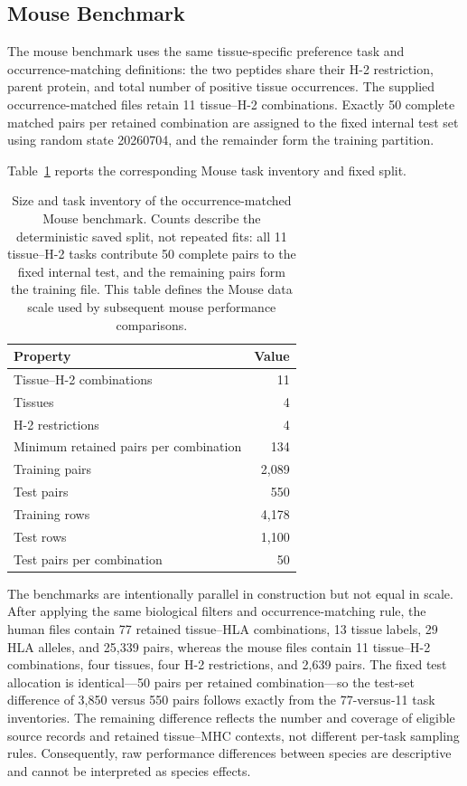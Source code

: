 \documentclass[webpdf,modern,large,nocrop,noinfo]{oup-authoring-template}
\newcommand{\plainHtwo}{H-2}
\begin{document}
\subsection{Mouse Benchmark}
\label{sec:mouse-benchmark}

The mouse benchmark uses the same tissue-specific preference task and occurrence-matching definitions: the two peptides share their H-2 restriction, parent protein, and total number of positive tissue occurrences. The supplied occurrence-matched files retain 11 tissue--H-2 combinations. Exactly 50 complete matched pairs per retained combination are assigned to the fixed internal test set using random state 20260704, and the remainder form the training partition.

Table~\ref{tab:mouse-benchmark-stats} reports the corresponding Mouse task inventory and fixed split.

\begin{table}[tbp]
\centering
\caption{Size and task inventory of the occurrence-matched Mouse benchmark. Counts describe the deterministic saved split, not repeated fits: all 11 tissue--H-2 tasks contribute 50 complete pairs to the fixed internal test, and the remaining pairs form the training file. This table defines the Mouse data scale used by subsequent mouse performance comparisons.}
\label{tab:mouse-benchmark-stats}
\small
\begin{tabularx}{\columnwidth}{@{}>{\raggedright\arraybackslash}Xr@{}}
\toprule
Property & Value \\
\midrule
Tissue--H-2 combinations & 11 \\
Tissues & 4 \\
\plainHtwo{} restrictions & 4 \\
Minimum retained pairs per combination & 134 \\
Training pairs & 2,089 \\
Test pairs & 550 \\
Training rows & 4,178 \\
Test rows & 1,100 \\
Test pairs per combination & 50 \\
\bottomrule
\end{tabularx}
\end{table}

The benchmarks are intentionally parallel in construction but not equal in scale. After applying the same biological filters and occurrence-matching rule, the human files contain 77 retained tissue--HLA combinations, 13 tissue labels, 29 HLA alleles, and 25,339 pairs, whereas the mouse files contain 11 tissue--H-2 combinations, four tissues, four H-2 restrictions, and 2,639 pairs. The fixed test allocation is identical---50 pairs per retained combination---so the test-set difference of 3,850 versus 550 pairs follows exactly from the 77-versus-11 task inventories. The remaining difference reflects the number and coverage of eligible source records and retained tissue--MHC contexts, not different per-task sampling rules. Consequently, raw performance differences between species are descriptive and cannot be interpreted as species effects.






\FloatBarrier
\balance

\end{document}
